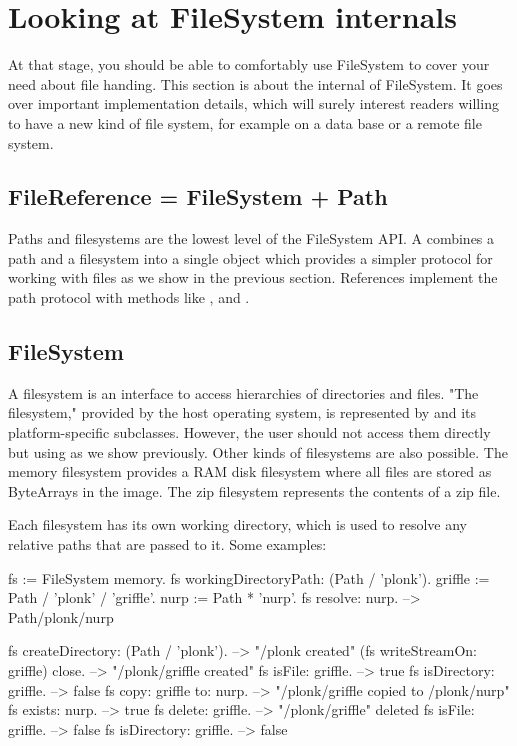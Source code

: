 \documentclass[a4paper,10pt,twoside]{book}
\begin{document}
\section{Looking at FileSystem internals}
At that stage, you should be able to comfortably use FileSystem to cover your need about file handing.
This section is about the internal of FileSystem. It goes over important implementation details, which will surely interest readers willing to have a new kind of file system, for example on a data base or a remote file system. 

\subsection{FileReference = FileSystem + Path}
Paths and filesystems are the lowest level of the FileSystem API. A  combines a path and a filesystem into a single object which provides a simpler protocol for working with files as we show in the previous section. References implement the path protocol with methods like \ct{/},  and .


\subsection{FileSystem}
A filesystem is an interface to access hierarchies of directories and files. "The filesystem," provided by the host operating system, is represented by  and its platform-specific subclasses. However, the user should not access them directly but using  as we show previously. Other kinds of filesystems are also possible. The memory filesystem provides a RAM disk filesystem where all files are stored as ByteArrays in the image. The zip filesystem represents the contents of a zip file.

Each filesystem has its own working directory, which is used to resolve any relative paths that are passed to it. Some examples:

\begin{code}{}
fs := FileSystem memory.
fs workingDirectoryPath: (Path / 'plonk').
griffle := Path / 'plonk' / 'griffle'.
nurp := Path * 'nurp'.
fs resolve: nurp.            
	--> Path/plonk/nurp
    
fs createDirectory: (Path / 'plonk').  --> "/plonk created"
(fs writeStreamOn: griffle) close.  --> "/plonk/griffle created"
fs isFile: griffle.         --> true
fs isDirectory: griffle.         --> false
fs copy: griffle to: nurp.       --> "/plonk/griffle copied to /plonk/nurp"
fs exists: nurp.             --> true
fs delete: griffle.          --> "/plonk/griffle" deleted
fs isFile: griffle.          --> false
fs isDirectory: griffle.         --> false
\end{code}
	
\end{document}
